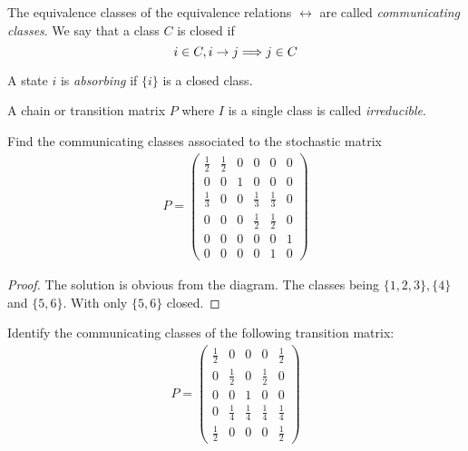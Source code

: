 \begin{defn}
The equivalence classes of the equivalence relations \(\leftrightarrow \) are called \emph{communicating classes}. We say that a class \(C\) is closed if
\[
i\in C, i\rightarrow j\space \Longrightarrow \space j\in C
\]
\end{defn}

\begin{defn}
A state \(i\) is \emph{absorbing} if \(\{i\}\) is a closed class.
\end{defn}

\begin{defn}
A chain or transition matrix \(P\) where \(I\) is a single class is called \emph{irreducible}.
\end{defn}

\begin{thm}[Example 1.2.2]
Find the communicating classes associated to the stochastic matrix
\begin{gather*}
P= \begin{pmatrix}\tfrac 12&\tfrac12&0&0&0&0\\
0&0&1&0&0&0 \\
\tfrac{1}{3}&0&0&\tfrac 13&\tfrac 13&0 \\
0&0&0&\tfrac{1}{2}&\tfrac{1}{2}&0 \\
0&0&0&0&0&1 \\
0&0&0&0&1&0
\end{pmatrix}
\end{gather*}
\end{thm}

\begin{proof}
The solution is obvious from the diagram. The classes being \(\{1,2,3\}, \{4\}\) and \(\{5,6\}\). With only \(\{5,6\}\) closed.

\end{proof}
\begin{thm}[Exercise 1.2.1]
Identify the communicating classes of the following transition matrix:
\begin{gather*}
P=
\begin{pmatrix}\tfrac{1}{2}&0&0&0&\tfrac{1}{2} \\
0&\tfrac{1}{2}&0&\tfrac{1}{2}&0 \\
0&0&1&0&0\\
0&\tfrac{1}{4}&\tfrac{1}{4}&\tfrac{1}{4}&\tfrac{1}{4} \\
\tfrac{1}{2}& 0&0&0&\tfrac{1}{2}\end{pmatrix}
\end{gather*}
\end{thm}

